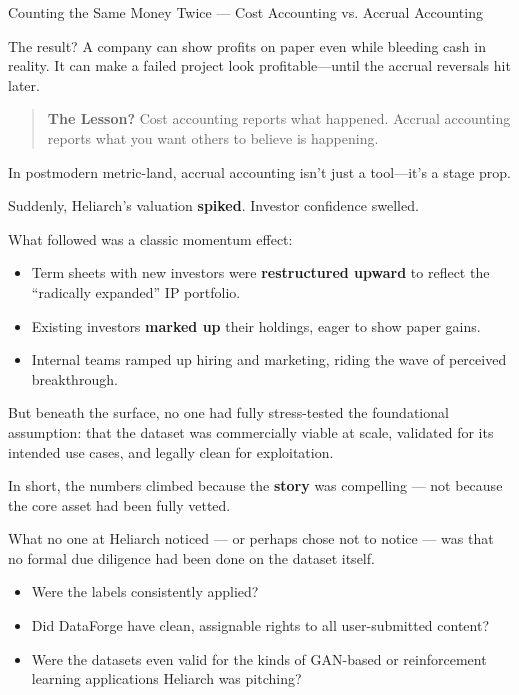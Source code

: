 \begin{HistoricalSidebar}{Counting the Same Money Twice — Cost Accounting vs. Accrual Accounting}
\medskip

The result?  
A company can show profits on paper even while bleeding cash in reality.  
It can make a failed project look profitable—until the accrual reversals hit later.

\begin{quote}
\textbf{The Lesson?} Cost accounting reports what happened. Accrual accounting reports what you want others to believe is happening.
\end{quote}

In postmodern metric-land, accrual accounting isn’t just a tool—it’s a stage prop.

\end{HistoricalSidebar}

Suddenly, Heliarch’s valuation \textbf{spiked}. Investor confidence swelled.

What followed was a classic momentum effect:

\begin{itemize}
    \item Term sheets with new investors were \textbf{restructured upward} to reflect the “radically expanded” IP portfolio.
    \item Existing investors \textbf{marked up} their holdings, eager to show paper gains.
    \item Internal teams ramped up hiring and marketing, riding the wave of perceived breakthrough.
\end{itemize}

But beneath the surface, no one had fully stress-tested the foundational assumption: that the dataset was commercially viable at scale, validated for its intended use cases, and legally clean for exploitation.

In short, the numbers climbed because the \textbf{story} was compelling — not because the core asset had been fully vetted.

What no one at Heliarch noticed --- or perhaps chose not to notice --- was that no formal due diligence had been done on the dataset itself.

\begin{itemize}
    \item Were the labels consistently applied?

    \item Did DataForge have clean, assignable rights to all user-submitted content?

    \item Were the datasets even valid for the kinds of GAN-based or reinforcement learning applications Heliarch was pitching?
\end{itemize}

